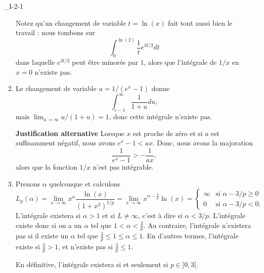 \begin{corrige}{_I-2-1}
\begin{enumerate}
Notez qu'un changement de variable $t=\ln(x)$ fait tout aussi bien le travail : nous tombons sur
\begin{equation}
	\int_{0}^{\ln(2)}\frac{1}{ t } e^{3t/2}dt
\end{equation}
dans laquelle $ e^{3t/2}$ peut être minorée par $1$, alors que l'intégrale de $1/x$ en $x=0$ n'existe pas.

\item 

Le changement de variable $u=1/(e^x-1)$ donne
\begin{equation}
	\int_{e-1}^{\infty}\frac{1}{ 1+u }du,
\end{equation}
mais $\lim_{u\to\infty}u/(1+u)=1$, donc cette intégrale n'existe pas.

{\bf Justification alternative}
Lorsque $x$ est proche de zéro et si $a$ est suffisamment négatif, nous avons $ e^{x}-1<ax$. Donc, nous avons la majoration
\begin{equation}
	\frac{1}{  e^{x}-1 }>-\frac{1}{ ax },
\end{equation}
alors que la fonction $1/x$ n'est pas intégrable.

\item 

Prenons $\alpha$ quelconque et calculons
\begin{equation}
	L_p(\alpha)=\lim_{x\to\infty}x^{\alpha}\frac{ \ln(x) }{ (1+x^3)^{1/p} }=\lim_{x\to\infty}x^{\alpha-\frac{ 3 }{ p }}\ln(x)=\begin{cases}
	\infty	&	\text{si $\alpha-3/p\geq 0$}\\
	0	&	 \text{si $\alpha-3/p<0$.}
\end{cases}
\end{equation}
L'intégrale existera si $\alpha>1$ et si $L\neq\infty$, c'est à dire si $\alpha<3/p$. L'intégrale existe donc si on a un $\alpha$ tel que $1<\alpha<\frac{ 3 }{ p }$. Au contraire, l'intégrale n'existera pas si il existe un $\alpha$ tel que $\frac{ 3 }{ p }\leq 1\leq\alpha\leq 1$. En d'autres termes, l'intégrale existe si $\frac{ 3 }{ p }>1$, et n'existe pas si $\frac{ 3 }{ p }\leq 1$.

En définitive, l'intégrale existera si et seulement si $p\in]0,3[$.


\end{enumerate}
\end{corrige}
